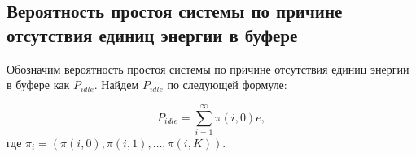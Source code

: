\documentclass[12pt, a4paper]{article}
\begin{document}
\begin{figure}[h]
\end{figure}

\pagebreak
\begin{flushleft}\subsection{Вероятность простоя системы по причине отсутствия единиц энергии в буфере}\end{flushleft}

Обозначим вероятность простоя системы по причине отсутствия единиц энергии в буфере как $P_{idle}$. Найдем $P_{idle}$ по следующей формуле:

$$P_{idle} = \sum\limits_{i = 1}^{\infty} \pi(i, 0)e,$$ где $\pi_i = (\pi(i, 0), \pi(i, 1), \ldots, \pi(i, K)).$
\end{document}
